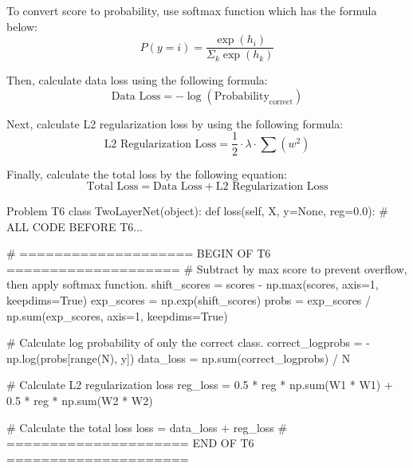 \documentclass[12pt, a4paper]{article}
\begin{document}
            To convert score to probability, use softmax function which has the formula below:
            \begin{equation}
                P(y=i) = \frac{\exp(h_i)}{\Sigma_k \exp(h_k)}
            \end{equation}

            Then, calculate data loss using the following formula:
            \begin{equation}
                \text{Data Loss} = - \log({\text{Probability}}_{\text{correct}})
            \end{equation}

            Next, calculate L2 regularization loss by using the following formula:
            \begin{equation}
                \text{L2 Regularization Loss} = \frac{1}{2} \cdot \lambda \cdot \sum ({w}^{2})
            \end{equation}

            Finally, calculate the total loss by the following equation:
            \begin{equation}
                \text{Total Loss} = \text{Data Loss} + \text{L2 Regularization Loss}
            \end{equation}

            \begin{codeblock}{Problem T6}
                class TwoLayerNet(object):
                    def loss(self, X, y=None, reg=0.0):
                        # ALL CODE BEFORE T6...

                        # ==================== BEGIN OF T6 ====================
                        # Subtract by max score to prevent overflow, then apply softmax function.
                        shift_scores = scores - np.max(scores, axis=1, keepdims=True)
                        exp_scores = np.exp(shift_scores)
                        probs = exp_scores / np.sum(exp_scores, axis=1, keepdims=True)

                        # Calculate log probability of only the correct class.
                        correct_logprobs = -np.log(probs[range(N), y])
                        data_loss = np.sum(correct_logprobs) / N

                        # Calculate L2 regularization loss
                        reg_loss = 0.5 * reg * np.sum(W1 * W1) + 0.5 * reg * np.sum(W2 * W2)

                        # Calculate the total loss
                        loss = data_loss + reg_loss
                        # ===================== END OF T6 =====================
            \end{codeblock}
\end{document}

